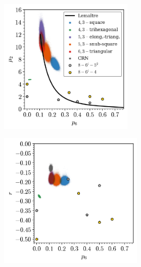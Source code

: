 \begin{figure}[bt]
     \centering
     
     \begin{subfigure}[b]{0.45\textwidth}
         \centering
         \includegraphics[height=6.5cm]{./figures/procrystals/pro3_p6_mu2.pdf}
         \caption{}
         \label{fig:pro3p6mu2}
     \end{subfigure}
     \hfill
     \begin{subfigure}[b]{0.45\textwidth}
         \centering
         \includegraphics[height=6.5cm]{./figures/procrystals/pro3_p6_r.pdf}
         \caption{}
         \label{fig:pro3p6r}
     \end{subfigure}
     

\end{figure}
